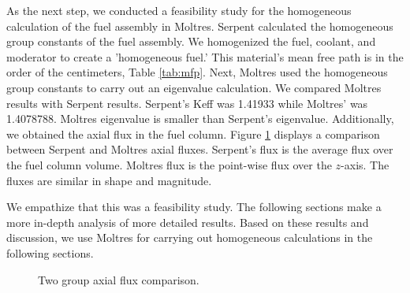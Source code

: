 \documentclass[11pt,letterpaper]{article}
\begin{document}
As the next step, we conducted a feasibility study for the homogeneous calculation of the fuel assembly in Moltres.
Serpent calculated the homogeneous group constants of the fuel assembly.
We homogenized the fuel, coolant, and moderator to create a 'homogeneous fuel.'
This material's mean free path is in the order of the centimeters, Table \ref{tab:mfp}.
Next, Moltres used the homogeneous group constants to carry out an eigenvalue calculation.
We compared Moltres results with Serpent results.
Serpent's \gls{Keff} was 1.41933 while Moltres' was 1.4078788.
Moltres eigenvalue is smaller than Serpent's eigenvalue.
Additionally, we obtained the axial flux in the fuel column.
Figure \ref{fig:prelim} displays a comparison between Serpent and Moltres axial fluxes.
Serpent's flux is the average flux over the fuel column volume.
Moltres flux is the point-wise flux over the $z$-axis.
The fluxes are similar in shape and magnitude.

We empathize that this was a feasibility study.
The following sections make a more in-depth analysis of more detailed results.
Based on these results and discussion, we use Moltres for carrying out homogeneous calculations in the following sections.

\begin{figure}[htbp!]
	\centering
	\hfill
  \caption{Two group axial flux comparison.}
	\label{fig:prelim}
\end{figure}
\end{document}
